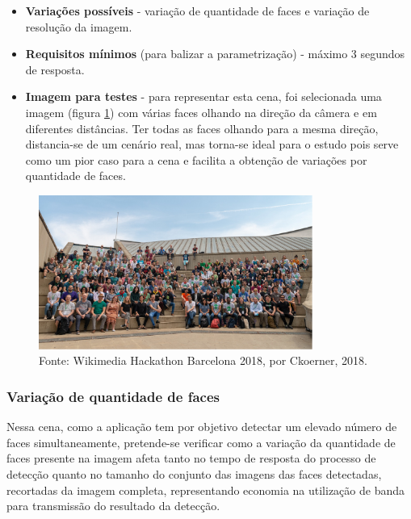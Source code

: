 \begin{itemize}
    \item \textbf{Variações possíveis} - variação de quantidade de faces e variação de resolução da imagem.
    \item \textbf{Requisitos mínimos} (para balizar a parametrização) - máximo 3 segundos de resposta.
    \item \textbf{Imagem para testes} - para representar esta cena, foi selecionada uma imagem (figura \ref{fig:imagemCena1}) com várias faces olhando na direção da câmera e em diferentes distâncias. Ter todas as faces olhando para a mesma direção, distancia-se de um cenário real, mas torna-se ideal para o estudo pois serve como um pior caso para a cena e facilita a obtenção de variações por quantidade de faces.
\end{itemize}

\begin{figure}[H]
    \centering
    \caption[Imagem selecionada para testes da cena 1.]{Imagem selecionada para testes da cena 1.}
    \includegraphics[width=0.8\textwidth]{Cap3_Desenvolvimento/Figures/imagem_cena1.jpg}
    \caption*{Fonte: Wikimedia Hackathon Barcelona 2018, por Ckoerner, 2018\footnotemark.}
    \label{fig:imagemCena1}
\end{figure}



\subsubsection{Variação de quantidade de faces}

Nessa cena, como a aplicação tem por objetivo detectar um elevado número de faces simultaneamente, pretende-se verificar como a variação da quantidade de faces presente na imagem afeta tanto no tempo de resposta do processo de detecção quanto no tamanho do conjunto das imagens das faces detectadas, recortadas da imagem completa, representando economia na utilização de banda para transmissão do resultado da detecção.

